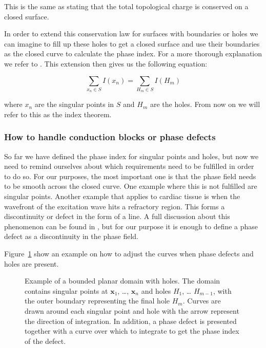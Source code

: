 \documentclass[twocolumn]{article}
\begin{document}
\noindent This is the same as stating that the total topological charge is
conserved on a closed surface.

In order to extend this conservation law for surfaces with boundaries or
holes we can imagine to fill up these holes to get a closed surface and
use their boundaries as the closed curve to calculate the phase index.
For a more thorough explanation we refer to
\autocite{herlin2012reconstruction, davidsen2004topological}. This
extension then gives us the following equation:

\begin{equation}
  \sum_{x_n \in S} I(x_n) = \sum_{H_m \in S} I(H_m)
  \label{eq:index-theorem-extended}
\end{equation}

\noindent where \(x_n\) are the singular points in \(S\) and \(H_m\) are the
holes. From now on we will refer to this as the index theorem.

\subsubsection{How to handle conduction blocks or phase
defects}\label{how-to-handle-conduction-blocks-or-phase-defects}

So far we have defined the phase index for singular points and holes,
but now we need to remind ourselves about which requirements need to be
fulfilled in order to do so. For our purposes, the most important one is
that the phase field needs to be smooth across the closed curve. One
example where this is not fulfilled are singular points. Another example
that applies to cardiac tissue is when the wavefront of the excitation
wave hits a refractory region. This forms a discontinuity or defect in
the form of a line. A full discussion about this phenomenon can be found
in \autocite{tomii2021spatial}, but for our purpose it is enough to define a
phase defect as a discontinuity in the phase field.

Figure~\ref{fig:index_calculation} show an example on how to adjust the curves
when phase defects and holes are present.

\begin{figure}[ht]
  \centering
  \caption{Example of a bounded planar domain with holes. The domain
    contains singular points at \(\pmb{x}_1\), \ldots, \(\pmb{x}_n\) and
    holes \(H_1\), \ldots{} \(H_{m-1}\), with the outer boundary
    representing the final hole \(H_m\). Curves are drawn around each
    singular point and hole with the arrow represent the direction of
    integration. In addition, a phase defect is presented together with a
  curve over which to integrate to get the phase index of the defect.}
  \label{fig:index_calculation}
\end{figure}
\end{document}
